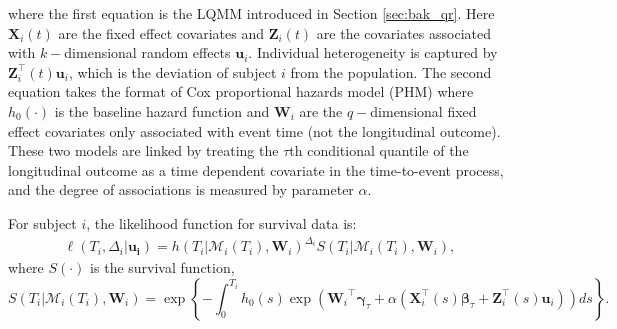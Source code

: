 \noindent where the first equation is the LQMM introduced in Section \ref{sec:bak_qr}. Here $\boldsymbol{X}_{i}(t)$ are the fixed effect covariates and $\boldsymbol{Z}_{i}(t)$ are the covariates associated with $k-$dimensional random effects $\boldsymbol{u}_i$. Individual heterogeneity is captured by ${\boldsymbol Z}_{i}^{\top}(t){\boldsymbol u}_i$, which is the deviation of subject $i$ from the population. The second equation takes the format of Cox proportional hazards model (PHM) where $h_0(\cdot)$ is the baseline hazard function and $\boldsymbol{W}_{i}$ are the $q-$dimensional fixed effect covariates only associated with event time (not the longitudinal outcome). These two models are linked by treating the $\tau$th conditional quantile of the longitudinal outcome as a time dependent covariate in the time-to-event process, and the degree of associations is measured by parameter $\alpha$.


For subject $i$, the likelihood function for survival data is:
\begin{eqnarray}\label{eqn:bak_lik_surv}
\ell(T_i, \Delta_i|\boldsymbol{{\boldsymbol u}_i}) =h(T_i|\mathcal{M}_{i}(T_i), \boldsymbol{W}_i)^{\Delta_i}S(T_i|\mathcal{M}_{i}(T_i), \boldsymbol{W}_i),
\end{eqnarray}
where $S(\cdot)$ is the survival function,
\begin{equation*}
S(T_i|\mathcal{M}_{i}(T_i), \boldsymbol{W}_i)=\exp\left\{-\int_0^{T_i}h_0(s)\exp({\boldsymbol W_i}^{\top}\boldsymbol{\gamma}_{\tau} + \alpha({\boldsymbol X}_i^{\top}(s)\boldsymbol{\beta}_{\tau} + {\boldsymbol Z}_i^{\top}(s){\boldsymbol u}_{i}))ds\right\}.
\end{equation*}



